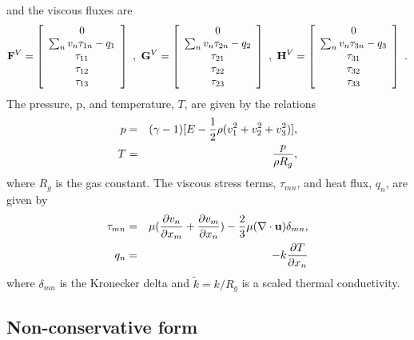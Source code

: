 \documentclass[10pt]{article}
\begin{document}
and the viscous fluxes are
$$
 {\bf F}^V = \left[ \begin{array}{c}
    0 \\ \sum_n v_n\tau_{1n}-q_1
      \\ \tau_{11} \\  \tau_{12} \\ \tau_{13}
                \end{array}\right]  ~,~
 {\bf G}^V = \left[ \begin{array}{c}
    0 \\ \sum_n v_n\tau_{2n}-q_2
      \\ \tau_{21} \\  \tau_{22} \\ \tau_{23}
                \end{array}\right] ~,~
 {\bf H}^V = \left[ \begin{array}{c}
    0 \\ \sum_n v_n\tau_{3n}-q_3
      \\ \tau_{31} \\  \tau_{32} \\ \tau_{33}
                \end{array}\right]   ~.
$$
The pressure, p, and temperature, $T$, are given by the relations
\begin{eqnarray*}
   p &=& (\gamma-1)[ E - {1\over2} \rho (v_1^2+v_2^2+v_3^2) ], \\
   T &=& {p\over\rho R_g},
\end{eqnarray*}
where $R_g$ is the gas constant.
The viscous stress terms, $\tau_{mn}$, and heat flux, $q_n$, are given by
\begin{eqnarray*}
  \tau_{mn} &=&  \mu( {\partial v_n \over\partial x_m}
                     +{\partial v_m \over\partial x_n}     )
            - {2\over3}\mu( \nabla\cdot{\bf u} ) \delta_{mn}, \\
   q_n &=& -k {\partial T \over \partial x_n} \\
\end{eqnarray*}
where $\delta_{mn}$ is the Kronecker delta and $\tilde{k}=k/R_g$
is a scaled thermal conductivity.



\subsection{Non-conservative form} 
\end{document}

